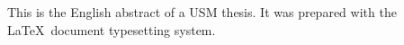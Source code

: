 \begin{EnAbstract}

This is the English abstract of a USM thesis.  It was prepared with the \LaTeX\ document typesetting system.

\end{EnAbstract}